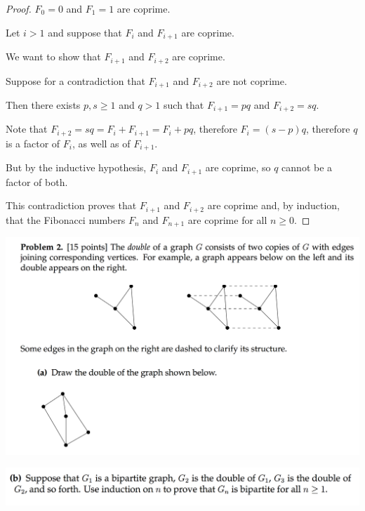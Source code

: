 \documentclass[12pt]{article}
\begin{document}
\begin{proof}
  $F_0 = 0$ and $F_1 = 1$ are coprime.

  Let $i > 1$ and suppose that $F_{i}$ and $F_{i+1}$ are coprime.

  We want to show that $F_{i+1}$ and $F_{i+2}$ are coprime.

  Suppose for a contradiction that $F_{i+1}$ and $F_{i+2}$ are not coprime.

  Then there exists $p, s \geq 1$ and $q > 1$ such that $F_{i+1} = pq$ and $F_{i+2} = sq$.

  Note that $F_{i+2} = sq = F_{i} + F_{i+1} = F_i + pq$, therefore $F_i = (s - p)q$, therefore
  $q$ is a factor of $F_i$, as well as of $F_{i+1}$.

  But by the inductive hypothesis, $F_{i}$ and $F_{i+1}$ are coprime, so $q$ cannot be a factor of
  both.

  This contradiction proves that $F_{i+1}$ and $F_{i+2}$ are coprime and, by induction, that the
  Fibonacci numbers $F_n$ and $F_{n+1}$ are coprime for all $n \geq 0$.


\end{proof}

\begin{mdframed}
\includegraphics[width=400pt]{img/MIT-math-for-cs-2004-2-1.png}
\end{mdframed}

\begin{mdframed}
\includegraphics[width=400pt]{img/MIT-math-for-cs-2004-2-2.png}
\end{mdframed}
\end{document}
